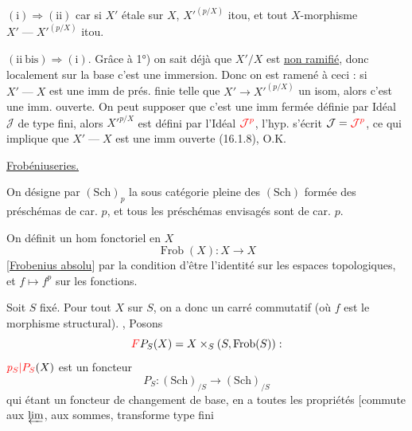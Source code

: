$(\mathrm{i})\Longrightarrow(\mathrm{ii})$ car si $X'$ étale sur $X$, $X'^{(p/X)}$ itou, et
tout $X$-morphisme $X'\mathbin{\text{---}}X'^{(p/X)}$ itou.

$(\mathrm{ii\ bis})\Longrightarrow(\mathrm{i})$. Grâce à 1°) on sait déjà que $X'/X$
est \uline{non ramifié}, donc localement  sur la base
 c'est une immersion. Donc
on est ramené à ceci : si $X'\mathbin{\text{---}}X$ est
une imm de prés. finie telle que
$X'\longrightarrow X'^{(p/X)}$ un isom, alors c'est une imm.
ouverte. On peut supposer que c'est
une imm fermée définie par Idéal $\mathcal J$
de type fini, alors $X'^{p/X}$ est défini
par l'Idéal ${\color{red}\mathcal J^p}$, l'hyp. s'écrit $\mathcal J={\color{red}\mathcal J^p}$,
ce qui implique que  $X'\mathbin{\text{---}}X$ est
une imm ouverte (16.1.8), O.K.

\uline{Frobéniuseries.}

On désigne par $(\mathrm{Sch})_p$  la sous catégorie pleine des $(\mathrm{Sch})$
formée des préschémas de car. $p$, et tous les préschémas
envisagés sont de car. $p$.

On définit un hom fonctoriel en $X$
\[
\operatorname{Frob}(X):X\longrightarrow X
\]
[\uline{Frobenius absolu}] par la condition d'être l'identité
sur les espaces topologiques, et $f\mapsto f^p$ sur les
fonctions.

Soit $S$ fixé. Pour tout $X$ sur $S$, on a donc
un carré commutatif
(où $f$ est le morphisme structural). , Posons
\[
\deleted{\unsure{F}}P_S(X)=X\times_S(S,\operatorname{Frob}(S)):
\]
${\color{red}p_S|P_S}(X)$ est un foncteur
\[
P_S:(\mathrm{Sch})_{/S}\longrightarrow(\mathrm{Sch})_{/S}
\]
qui étant un foncteur de changement de base, en
a toutes les propriétés [commute aux
$\varprojlim$, aux sommes, transforme type fini

